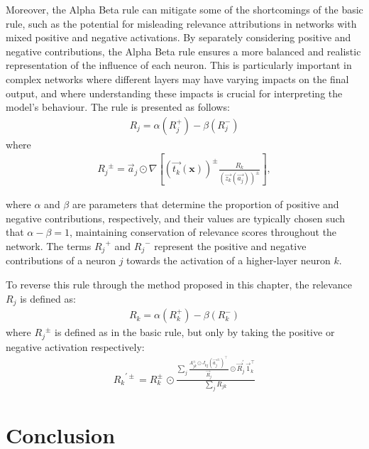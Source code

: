 Moreover, the Alpha Beta rule can mitigate some of the shortcomings of the basic rule, such as the potential for misleading relevance attributions in networks with mixed positive and negative activations. By separately considering positive and negative contributions, the Alpha Beta rule ensures a more balanced and realistic representation of the influence of each neuron. This is particularly important in complex networks where different layers may have varying impacts on the final output, and where understanding these impacts is crucial for interpreting the model's behaviour. The rule is presented as follows:
\begin{eqnarray*}
R_{j}= \alpha (R_{j}^+) - \beta(R_{j}^-)
\end{eqnarray*}
where
\begin{eqnarray*}
{R_{j}}^\pm = \vec{a}_{j} \odot \nabla\left [(\vec{t_{k}}(\boldsymbol{x}))^\pm\frac{R_{k}}{(\vec{z_k}(\vec{a_j}))^\pm}\right], 
\end{eqnarray*}

where \(\alpha\) and \(\beta\) are parameters that determine the proportion of positive and negative contributions, respectively, and their values are typically chosen such that \(\alpha - \beta = 1\), maintaining conservation of relevance scores throughout the network. The terms \({R_{j}}^+\) and \({R_{j}}^-\) represent the positive and negative contributions of a neuron \(j\) towards the activation of a higher-layer neuron \(k\). 

To reverse this rule through the method proposed in this chapter, the relevance $R_{j}$ is defined as:
\begin{eqnarray*}
R_{k}= \alpha (R_{k}^+) - \beta(R_{k}^-)
\end{eqnarray*}
where ${R_{j}}^{\pm}$ is defined as in the basic rule, but only by taking the positive or negative activation respectively:
\begin{eqnarray*}
{R_{k}}^{\prime\pm}=  R_{k}^\pm\, \odot \frac{\sum_{j}\frac{A_{jk}^\pm \odot J_{kj}(\vec{a_j}^\pm)^\intercal\,}{ \vec{R}_{j}} \odot \vec{R}_j^\prime \, \vec{1}_k^\intercal}{\sum_{j} R_{jk}}
\end{eqnarray*}


\section{Conclusion}

